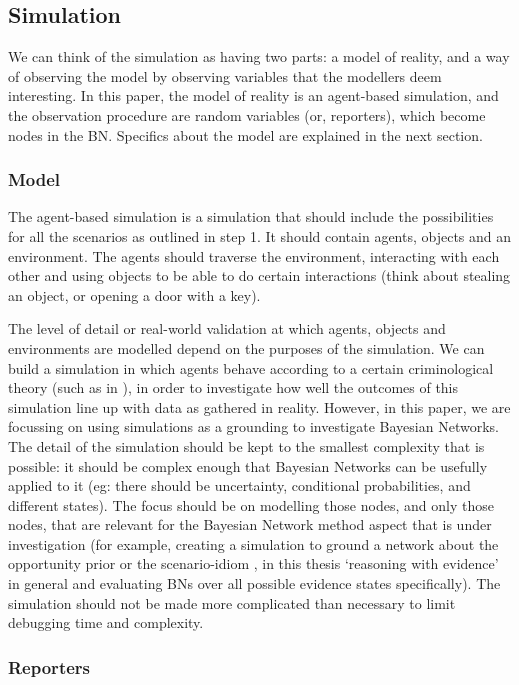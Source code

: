 \documentclass[12pt]{article}
\begin{document}
\subsection{Simulation}
We can think of the simulation as having two parts: a model of reality, and a way of observing the model by observing variables that the modellers deem interesting. In this paper, the model of reality is an agent-based simulation, and the observation procedure are random variables (or, reporters), which become nodes in the BN. Specifics about the model are explained in the next section.

\subsubsection{Model}

The agent-based simulation is a simulation that should include the possibilities for all the scenarios as outlined in step 1. It should contain agents, objects and an environment. The agents should traverse the environment, interacting with each other and using objects to be able to do certain interactions (think about stealing an object, or opening a door with a key).

The level of detail or real-world validation at which agents, objects and environments are modelled depend on the purposes of the simulation. We can build a simulation in which agents behave according to a certain criminological theory (such as in \citep{Zhu2021}), in order to investigate how well the outcomes of this simulation line up with data as gathered in reality. However, in this paper, we are focussing on using simulations as a grounding to investigate Bayesian Networks. The detail of the simulation should be kept to the smallest complexity that is possible: it should be complex enough that Bayesian Networks can be usefully applied to it (eg: there should be uncertainty, conditional probabilities, and different states). The focus should be on modelling those nodes, and only those nodes, that are relevant for the Bayesian Network method aspect that is under investigation (for example, creating a simulation to ground a network about the opportunity prior \citep{Fenton2017} or the scenario-idiom \citep{vlek2016}, in this thesis `reasoning with evidence' in general and evaluating BNs over all possible evidence states specifically). The simulation should not be made more complicated than necessary to limit debugging time and complexity.

\subsubsection{Reporters}
\end{document}

